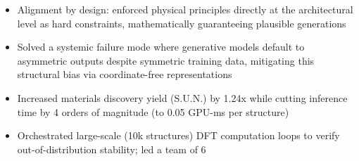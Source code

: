 \documentclass[11pt,a4paper]{article}
\newlength{\projbulletindent}\setlength{\projbulletindent}{2.7em}
\begin{document}
\begin{itemize}[leftmargin=\projbulletindent]
  \item Alignment by design: enforced physical principles directly at the architectural level as hard constraints, mathematically guaranteeing plausible generations
  \item Solved a systemic failure mode where generative models default to asymmetric outputs despite symmetric training data, mitigating this structural bias via coordinate-free representations
  \item Increased materials discovery yield (S.U.N.) by 1.24x while cutting inference time by 4 orders of magnitude (to 0.05 GPU-ms per structure)
  \item Orchestrated large-scale (10k structures) DFT computation loops to verify out-of-distribution stability; led a team of 6
\end{itemize}
\smallskip
\end{document}
